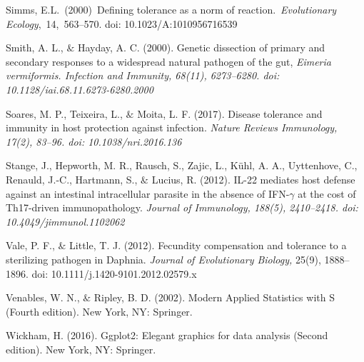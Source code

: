\documentclass[12pt]{article}
\renewcommand{\_}{\kern-1.5pt\textunderscore\kern-1.5pt}
\begin{document}
\begin{FlushLeft}
\textcolor[HTML]{1C1D1E}{Simms, E.L. (2000) Defining tolerance as a norm of reaction. \textit{Evolutionary Ecology}, 14, 563–570. doi: 10.1023/A:1010956716539}
\end{FlushLeft}\par

\begin{FlushLeft}
Smith, A. L., $\&$  Hayday, A. C. (2000). Genetic dissection of primary and secondary responses to a widespread natural pathogen of the gut, \textit{Eimeria vermiformis. Infection and Immunity, 68(11), 6273–6280. doi: 10.1128/iai.68.11.6273-6280.2000}
\end{FlushLeft}\par

\begin{FlushLeft}
Soares, M. P., Teixeira, L., $\&$  Moita, L. F. (2017). Disease tolerance and immunity in host protection against infection. \textit{Nature Reviews Immunology, 17(2), 83–96. doi: 10.1038/nri.2016.136}
\end{FlushLeft}\par

\begin{FlushLeft}
Stange, J., Hepworth, M. R., Rausch, S., Zajic, L., Kühl, A. A., Uyttenhove, C., Renauld, J.-C., Hartmann, S., $\&$  Lucius, R. (2012). IL-22 mediates host defense against an intestinal intracellular parasite in the absence of IFN-$ \gamma $  at the cost of Th17-driven immunopathology. \textit{Journal of Immunology, 188(5), 2410–2418. doi: 10.4049/jimmunol.1102062 }
\end{FlushLeft}\par

\begin{FlushLeft}
Vale, P. F., $\&$  Little, T. J. (2012). Fecundity compensation and tolerance to a sterilizing pathogen in Daphnia. \textit{Journal of Evolutionary Biology,} 25(9), 1888–1896. doi: 10.1111/j.1420-9101.2012.02579.x
\end{FlushLeft}\par

\begin{FlushLeft}
Venables, W. N., $\&$  Ripley, B. D. (2002). Modern Applied Statistics with S (Fourth edition). New York, NY: Springer.
\end{FlushLeft}\par

\begin{FlushLeft}
Wickham, H. (2016). Ggplot2: Elegant graphics for data analysis (Second edition). New York, NY: Springer.
\end{FlushLeft}\par
\end{document}
